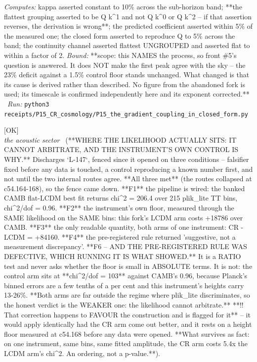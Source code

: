\begin{description}
\emph{Computes:} kappa asserted constant to 10\% across the sub-horizon band; **the flattest grouping asserted to be Q k\textasciicircum{}1 and not Q k\textasciicircum{}0 or Q k\textasciicircum{}2 -- if that assertion reverses, the derivation is wrong**; the predicted coefficient asserted within 5\% of the measured one; the closed form asserted to reproduce Q to 5\% across the band; the continuity channel asserted flattest UNGROUPED and asserted flat to within a factor of 2.
 \emph{Bound:} **scope: this NAMES the process, so front \#5's question is answered. It does NOT make the first peak agree with the sky -- the 23\% deficit against a 1.5\% control floor stands unchanged. What changed is that its cause is derived rather than described. No figure from the abandoned fork is used; its timescale is confirmed independently here and its exponent corrected.**
\ \emph{Run:} \texttt{python3 receipts/P15\_CR\_cosmology/P15\_the\_gradient\_coupling\_in\_closed\_form.py}
\item[\label{rcpt:P15_where_the_likelihood_sits}\texttt{P15\_where\_the\_likelihood\_sits}]\hfill\textsf{[OK]}\\
\textit{the acoustic sector} \ (**WHERE THE LIKELIHOOD ACTUALLY SITS: IT CANNOT ARBITRATE, AND THE INSTRUMENT'S OWN CONTROL IS WHY.** Discharges `L-147`, fenced since it opened on three conditions -- falsifier fixed before any data is touched, a control reproducing a known number first, and not until the two internal routes agree. **All three met** (the routes collapsed at c54.164-168), so the fence came down. **F1** the pipeline is wired: the banked CAMB flat-LCDM best fit returns chi\textasciicircum{}2 = 206.4 over 215 plik\_lite TT bins, chi\textasciicircum{}2/dof = 0.96. **F2** the instrument's own floor, measured through the SAME likelihood on the SAME bins: this fork's LCDM arm costs +18786 over CAMB. **F3** the only readable quantity, both arms of one instrument: CR - LCDM = +84160. **F4** the pre-registered rule returned 'suggestive, not a measurement discrepancy'. **F6 -- AND THE PRE-REGISTERED RULE WAS DEFECTIVE, WHICH RUNNING IT IS WHAT SHOWED.** It is a RATIO test and never asks whether the floor is small in ABSOLUTE terms. It is not: the control arm sits at **chi\textasciicircum{}2/dof = 103** against CAMB's 0.96, because Planck's binned errors are a few tenths of a per cent and this instrument's heights carry 13-26\%. **Both arms are far outside the regime where plik\_lite discriminates, so the honest verdict is the WEAKER one: the likelihood cannot arbitrate.** **!! That correction happens to FAVOUR the construction and is flagged for it** -- it would apply identically had the CR arm come out better, and it rests on a height floor measured at c54.168 before any data were opened. **What survives as fact: on one instrument, same bins, same fitted amplitude, the CR arm costs 5.4x the LCDM arm's chi\textasciicircum{}2. An ordering, not a p-value.**). 

\end{description}
